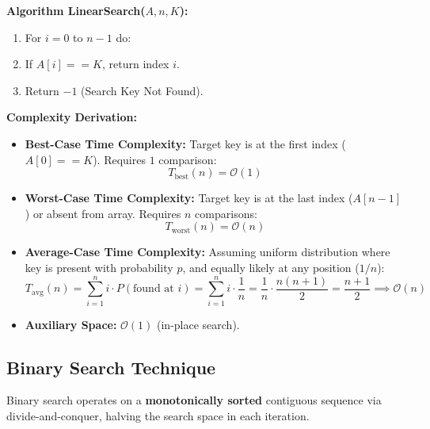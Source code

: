 \documentclass[12pt,a4paper]{article}
\begin{document}
\begin{tcolorbox}[formulabox, title={\textbf{Linear Search Algorithm and Complexity Proof}}]
\textbf{Algorithm LinearSearch($A, n, K$):}
\begin{enumerate}[leftmargin=*, nosep]
  \item For $i = 0$ to $n - 1$ do:
  \item \quad If $A[i] == K$, return index $i$.
  \item Return $-1$ (Search Key Not Found).
\end{enumerate}
\par\vspace{4pt}\noindent
\textbf{Complexity Derivation:}
\begin{itemize}[leftmargin=*, itemsep=2pt]
  \item \textbf{Best-Case Time Complexity:} Target key is at the first index ($A[0] == K$). Requires $1$ comparison:
  \begin{equation}
    T_{\text{best}}(n) = \mathcal{O}(1)
  \end{equation}
  \item \textbf{Worst-Case Time Complexity:} Target key is at the last index ($A[n-1]$) or absent from array. Requires $n$ comparisons:
  \begin{equation}
    T_{\text{worst}}(n) = \mathcal{O}(n)
  \end{equation}
  \item \textbf{Average-Case Time Complexity:} Assuming uniform distribution where key is present with probability $p$, and equally likely at any position ($1/n$):
  \begin{equation}
    T_{\text{avg}}(n) = \sum_{i=1}^n i \cdot P(\text{found at } i) = \sum_{i=1}^n i \cdot \frac{1}{n} = \frac{1}{n} \cdot \frac{n(n+1)}{2} = \frac{n+1}{2} \implies \mathcal{O}(n)
  \end{equation}
  \item \textbf{Auxiliary Space:} $\mathcal{O}(1)$ (in-place search).
\end{itemize}
\end{tcolorbox}

\subsection{Binary Search Technique}
Binary search operates on a \textbf{monotonically sorted} contiguous sequence via divide-and-conquer, halving the search space in each iteration.
\end{document}
